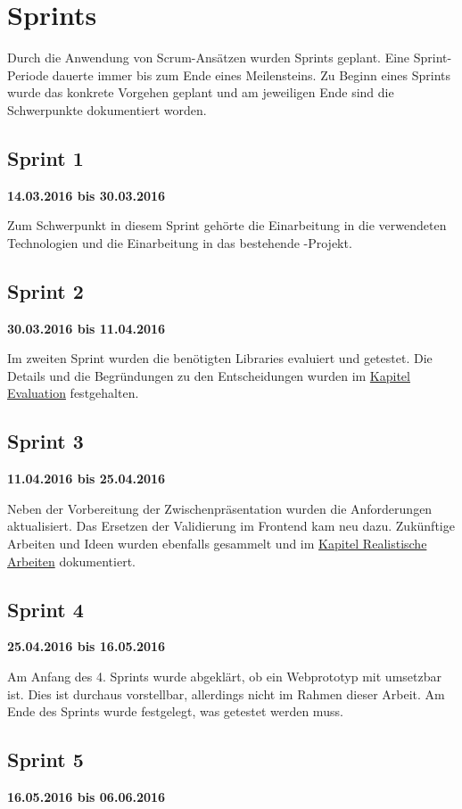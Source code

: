 \section{Sprints}
Durch die Anwendung von Scrum-Ansätzen wurden Sprints geplant. 
Eine Sprint-Periode dauerte immer bis zum Ende eines Meilensteins. 
Zu Beginn eines Sprints wurde das konkrete Vorgehen geplant und am jeweiligen Ende sind die Schwerpunkte dokumentiert worden.


\subsection{Sprint 1}
\textbf{14.03.2016 bis 30.03.2016}

Zum Schwerpunkt in diesem Sprint gehörte die Einarbeitung in die verwendeten Technologien und die Einarbeitung in das bestehende \kort{}-Projekt.

\subsection{Sprint 2}
\textbf{30.03.2016 bis 11.04.2016}

Im zweiten Sprint wurden die benötigten Libraries evaluiert und getestet.
Die Details und die Begründungen zu den Entscheidungen wurden im \hyperref[tb-evaluation]{Kapitel Evaluation} festgehalten.

\subsection{Sprint 3}
\textbf{11.04.2016 bis 25.04.2016}

Neben der Vorbereitung der Zwischenpräsentation wurden die Anforderungen aktualisiert. 
Das Ersetzen der Validierung im Frontend kam neu dazu. 
Zukünftige Arbeiten und Ideen wurden ebenfalls gesammelt und im \hyperref[pd-weiterentwicklung-realistisch]{Kapitel Realistische Arbeiten} dokumentiert.

\subsection{Sprint 4}
\textbf{25.04.2016 bis 16.05.2016}

Am Anfang des 4. Sprints wurde abgeklärt, ob ein Webprototyp mit  umsetzbar ist. 
Dies ist durchaus vorstellbar, allerdings nicht im Rahmen dieser Arbeit.
Am Ende des Sprints wurde festgelegt, was getestet werden muss.

\subsection{Sprint 5}
\textbf{16.05.2016 bis 06.06.2016}

